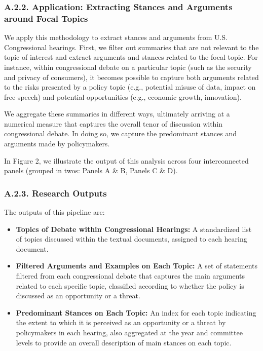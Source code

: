 \documentclass[11pt]{article}
\begin{document}
\subsubsection*{A.2.2. Application: Extracting Stances and Arguments around Focal Topics}

We apply this methodology to extract stances and arguments from U.S. Congressional hearings. First, we filter out summaries that are not relevant to the topic of interest and extract arguments and stances related to the focal topic. For instance, within congressional debate on a particular topic (such as the security and privacy of consumers), it becomes possible to capture both arguments related to the risks presented by a policy topic (e.g., potential misuse of data, impact on free speech) and potential opportunities (e.g., economic growth, innovation).

We aggregate these summaries in different ways, ultimately arriving at a numerical measure that captures the overall tenor of discussion within congressional debate. In doing so, we capture the predominant stances and arguments made by policymakers.

In Figure 2, we illustrate the output of this analysis across four interconnected panels (grouped in twos: Panels A \& B, Panels C \& D).

\subsubsection*{A.2.3. Research Outputs}

The outputs of this pipeline are:

\begin{itemize}
    \item \textbf{Topics of Debate within Congressional Hearings:} A standardized list of topics discussed within the textual documents, assigned to each hearing document.
    \item \textbf{Filtered Arguments and Examples on Each Topic:} A set of statements filtered from each congressional debate that captures the main arguments related to each specific topic, classified according to whether the policy is discussed as an opportunity or a threat.
    \item \textbf{Predominant Stances on Each Topic:} An index for each topic indicating the extent to which it is perceived as an opportunity or a threat by policymakers in each hearing, also aggregated at the year and committee levels to provide an overall description of main stances on each topic.
\end{itemize}
\end{document}
